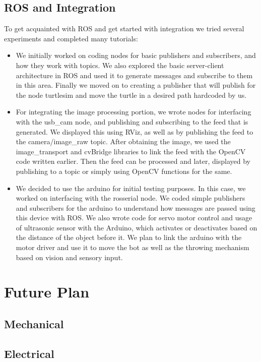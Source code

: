 \documentclass[11pt]{article}
\begin{document}
\subsection{ROS and Integration}
To get acquainted with ROS and get started with integration we tried several experiments and completed many tutorials:
\begin{itemize}
\item{We initially worked on coding nodes for basic publishers and subscribers, and how they work with topics. We also explored the basic server-client architecture in ROS and used it to generate messages and subscribe to them in this area. Finally we moved on to creating a publisher that will publish for the node turtlesim and move the turtle in a desired path hardcoded by us.}
\item{For integrating the image processing portion, we wrote nodes for interfacing with the usb\_cam node, and publishing and subscribing to the feed that is generated. We displayed this using RViz, as well as by publishing the feed to the camera/image\_raw topic. After obtaining the image, we used the image\_transport and cvBridge libraries to link the feed with the OpenCV code written earlier. Then the feed can be processed and later, displayed by publishing to a topic or simply using OpenCV functions for the same.}
\item{We decided to use the arduino for initial testing purposes. In this case, we worked on interfacing with the rosserial node. We coded simple publishers and subscribers for the arduino to understand how messages are passed using this device with ROS. We also wrote code for servo motor control and usage of ultrasonic sensor with the Arduino, which activates or deactivates based on the distance of the object before it. We plan to link the arduino with the motor driver and use it to move the bot as well as the throwing mechanism based on vision and sensory input. 
}
\end{itemize}

\pagebreak

\section{Future Plan}
\subsection{Mechanical}
\subsection{Electrical}
\end{document}
